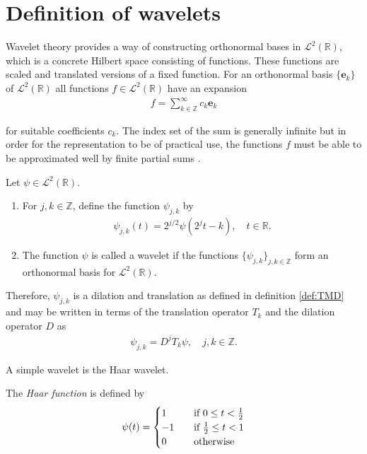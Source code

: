 \section{Definition of wavelets}
Wavelet theory provides a way of constructing orthonormal bases in $\mathcal{L}^2(\mathbb{R})$, which is a concrete Hilbert space consisting of functions. These functions are scaled and translated versions of a fixed function. For an orthonormal basis $\{\textbf{e}_k\}$ of $\mathcal{L}^2(\mathbb{R})$ all functions $f \in \mathcal{L}^2(\mathbb{R})$ have an expansion
\begin{align*}
f = \sum_{k\in\mathbb{Z}}^\infty c_k \textbf{e}_k
\end{align*}

for suitable coefficients $c_k$. The index set of the sum is generally infinite but in order for the representation to be of practical use, the functions $f$ must be able to be approximated well by finite partial sums \cite{page 160, FSE2010}.

\begin{definition}[Wavelet]
Let $\psi \in \mathcal{L}^2(\mathbb{R})$.
\begin{enumerate}
\item For $j,k \in \mathbb{Z}$, define the function $\psi_{j,k}$ by
\begin{align*}
\psi_{j,k}(t) = 2^{j/2} \psi(2^jt-k), \quad t \in \mathbb{R}.
\end{align*}
\item The function $\psi$ is called a wavelet if the functions $\{\psi_{j,k}\}_{j,k\in\mathbb{Z}}$ form an orthonormal basis for $\mathcal{L}^2(\mathbb{R})$.
\end{enumerate}
\end{definition}

Therefore, $\psi_{j,k}$ is a dilation and translation as defined in definition \ref{def:TMD} and may be written in terms of the translation operator $T_k$ and the dilation operator $D$ as \cite{page 160, FSE2010}
\begin{align*}
\psi_{j,k} = D^j T_k \psi, \quad j,k \in \mathbb{Z}.
\end{align*}

A simple wavelet is the Haar wavelet.

\begin{definition} \label{HaarWave}
The \textit{Haar function} is defined by
\begin{align*}
\psi(t) =
\begin{cases}
1 \quad &\textnormal{if } 0 \leq t < \frac{1}{2} \\
-1 \quad &\textnormal{if } \frac{1}{2} \leq t < 1 \\
0 \quad &\textnormal{otherwise}
\end{cases}
\end{align*}
\end{definition}


